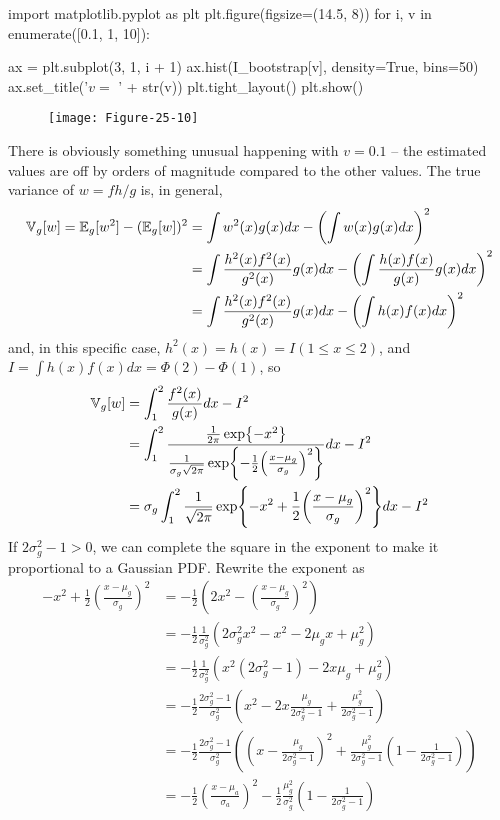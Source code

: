 \begin{python}
import matplotlib.pyplot as plt
plt.figure(figsize=(14.5, 8))
for i, v in enumerate([0.1, 1, 10]):
    
    ax = plt.subplot(3, 1, i + 1)
    ax.hist(I_bootstrap[v], density=True, bins=50)
    ax.set_title('$v = $ ' + str(v))
plt.tight_layout()
plt.show()
\end{python}

\begin{figure}[H]
\centering
\texttt{[image: Figure-25-10]}
\end{figure}

There is obviously something unusual happening with \(v = 0.1\) -- the
estimated values are off by orders of magnitude compared to the other
values.
The true variance of \(w = f h / g\) is, in general,
\begin{align*}
\VAR_g[w] = \EXP_g[w^{2}] - (\EXP_g[w])^{2} &= \int w^{2}(x) g(x) dx - \left( \int w(x) g(x) dx \right)^{2} \\
&= \int \frac{h^{2}(x) f^{2}(x)}{g^{2}(x)} g(x) dx - \left( \int \frac{h(x) f(x)}{g(x)} g(x) dx \right)^{2} \\
&= \int \frac{h^{2}(x) f^{2}(x)}{g^{2}(x)} g(x) dx - \left( \int h(x) f(x) dx \right)^{2}
\end{align*}
and, in this specific case, \(h^{2}(x) = h(x) = I(1 \leq x \leq 2)\), and
\(I = \int h(x) f(x) dx = \Phi(2) - \Phi(1)\), so
\begin{align*}
\VAR_g[w] &= \int_{1}^{2} \frac{f^{2}(x)}{g(x)} dx - I^{2} \\
&= \int_{1}^{2} \frac{\frac{1}{2 \pi} \exp \left\{-x^{2} \right\}}{\frac{1}{\sigma_g \sqrt{2 \pi}} \exp \left\{-\frac{1}{2} \left(\frac{x - \mu_g}{\sigma_g}\right)^{2} \right\} } dx - I^{2} \\
&= \sigma_g \int_{1}^{2} \frac{1}{\sqrt{2 \pi}} \exp \left\{ -x^{2} +\frac{1}{2} \left(\frac{x - \mu_g}{\sigma_g}\right)^{2} \right\} dx - I^{2}
\end{align*}
If \(2 \sigma_g^{2} - 1 > 0\), we can complete the square in the exponent
to make it proportional to a Gaussian PDF. Rewrite the exponent as
\begin{align*}
-x^{2} +\frac{1}{2} \left(\frac{x - \mu_g}{\sigma_g}\right)^{2} &= -\frac{1}{2} \left( 2x^{2} -  \left(\frac{x - \mu_g}{\sigma_g}\right)^{2} \right) \\
&= -\frac{1}{2} \frac{1}{\sigma_g^{2}} \left( 2 \sigma_g^{2} x^{2}  - x^{2} - 2 \mu_g x + \mu_g^{2} \right) \\
&= -\frac{1}{2} \frac{1}{\sigma_g^{2}} \left( x^{2} (2\sigma_g^{2} - 1) - 2x \mu_g + \mu_g^{2} \right) \\
&= -\frac{1}{2} \frac{2\sigma_g^{2} - 1}{\sigma_g^{2}} \left( x^{2} - 2x \frac{\mu_g}{2\sigma_g^{2} - 1} + \frac{\mu_g^{2}}{2\sigma_g^{2} - 1} \right) \\
&= -\frac{1}{2} \frac{2\sigma_g^{2} - 1}{\sigma_g^{2}} \left( \left( x - \frac{\mu_g}{2\sigma_g^{2} - 1} \right)^{2}  + \frac{\mu_g^{2}}{2\sigma_g^{2} - 1}\left(1 - \frac{1}{2\sigma_g^{2} - 1} \right) \right) \\
&= -\frac{1}{2} \left( \frac{x - \mu_a}{\sigma_a} \right)^{2} - \frac{1}{2} \frac{\mu_g^{2}}{\sigma_g^{2}} \left(1 - \frac{1}{2\sigma_g^{2} - 1} \right)
\end{align*}

